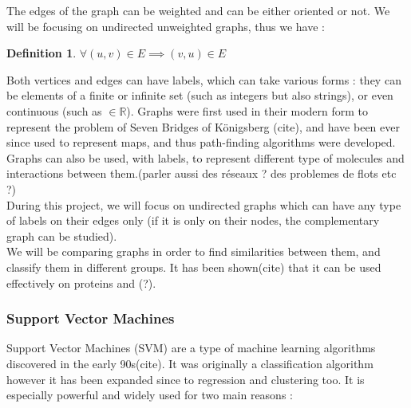 \documentclass{article}
\newcommand*{\R}{%
  \mathbb{R}%
}
\theoremstyle{definition}
\newtheorem{definition}{Definition}[section]
\begin{document}
The edges of the graph can be weighted and can be either oriented or not. We will be focusing on undirected unweighted graphs, thus we have :
\begin{definition}
	$\forall (u,v) \in E \implies (v,u)\in E$
\end{definition}
Both vertices and edges can have labels, which can take various forms : they can be elements of a finite or infinite set (such as integers but also strings), or even continuous (such as $\in \R$).
Graphs were first used in their modern form to represent the problem of Seven Bridges of Königsberg (cite), and have been ever since used to represent maps, and thus path-finding algorithms were developed. Graphs can also be used, with labels, to represent different type of molecules and interactions between them.(parler aussi des réseaux ? des problemes de flots etc ?)\\
During this project, we will focus on undirected graphs which can have any type of labels on their edges only (if it is only on their nodes, the complementary graph can be studied).\\
We will be comparing graphs in order to find similarities between them, and classify them in different groups. It has been shown(cite) that it can be used effectively on proteins and (?).
\subsubsection{Support Vector Machines}
Support Vector Machines (SVM) are a type of machine learning algorithms discovered in the early 90s(cite). It was originally a classification algorithm however it has been expanded since to regression and clustering too. It is especially powerful and widely used for two main reasons :
\end{document}
